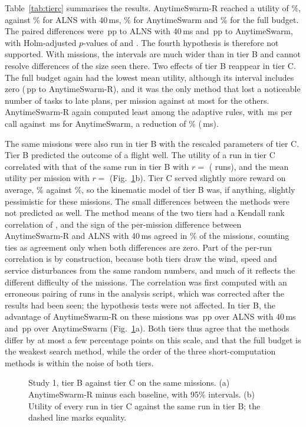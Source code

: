Table~\ref{tab:tierc} summarises the results. AnytimeSwarm-R reached a utility of \%, against
\% for ALNS with 40\,ms, \% for AnytimeSwarm and \% for the full budget.
The paired differences were \,pp to ALNS with 40\,ms and \,pp to AnytimeSwarm, with
Holm-adjusted $p$-values of  and . The fourth hypothesis is therefore not supported. With
 missions, the intervals are much wider than in tier B and cannot resolve differences of the size seen there.
Two effects of tier B reappear in tier C. The full budget again had the lowest mean utility, although its interval
includes zero (\,pp to AnytimeSwarm-R), and it was the only method that lost a noticeable number of tasks
to late plans,
 per mission against at most  for the others. AnytimeSwarm-R again computed least among
the adaptive rules, with \,ms per call against \,ms for AnytimeSwarm, a reduction of
\% (\,ms).


The same  missions were also run in tier B with the rescaled parameters of tier C. Tier B predicted the outcome
of a flight well. The utility of a run in tier C correlated with that of the same run in tier B with $r=$ 
( runs), and the mean utility per mission with $r=$  (Fig.~\ref{fig:bc}b). Tier C served
slightly more reward on average, \% against \%, so the kinematic model of tier B was, if anything,
slightly pessimistic for these missions. The small
differences between the methods were not predicted as well. The method means of the two tiers had a Kendall rank
correlation of , and the sign of the per-mission difference between AnytimeSwarm-R and ALNS with 40\,ms
agreed in \% of the missions, counting ties as agreement only when both differences are zero.
Part of the per-run correlation is by construction, because both tiers draw the wind, speed and service disturbances
from the same random numbers, and much of it reflects the different difficulty of the missions. The correlation was
first computed with an erroneous pairing of runs in the analysis script, which was corrected after the results had
been seen; the hypothesis tests were not affected. In tier B, the advantage of AnytimeSwarm-R on these missions
was \,pp over ALNS with 40\,ms and \,pp over AnytimeSwarm (Fig.~\ref{fig:bc}a). Both
tiers thus agree that the methods differ by at most a few percentage points on this scale, and that the full budget is
the weakest search method, while the order of the three short-computation methods is within the noise of both tiers.

\begin{figure}[t]
\centering
{}
\caption{Study 1, tier B against tier C on the same  missions. (a) AnytimeSwarm-R minus each baseline, with 95\% intervals. (b) Utility of every run in tier C against the same run in tier B; the dashed line marks equality.}\label{fig:bc}
\end{figure}
